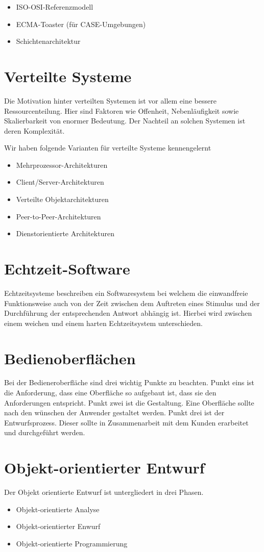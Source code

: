 \begin{itemize}
\item ISO-OSI-Referenzmodell
\item ECMA-Toaster (für CASE-Umgebungen)
\item Schichtenarchitektur 
\end{itemize}

\section{Verteilte Systeme}
Die Motivation hinter verteilten Systemen ist vor allem eine bessere Ressourcenteilung. Hier sind Faktoren wie Offenheit, Nebenläufigkeit sowie Skalierbarkeit von enormer Bedeutung. Der Nachteil an solchen Systemen ist deren Komplexität.

Wir haben folgende Varianten für verteilte Systeme kennengelernt
\begin{itemize}
\item Mehrprozessor-Architekturen
\item Client/Server-Architekturen
\item Verteilte Objektarchitekturen
\item Peer-to-Peer-Architekturen
\item Dienstorientierte Architekturen
\end{itemize}

\section{Echtzeit-Software}
Echtzeitsysteme beschreiben ein Softwaresystem bei welchem die einwandfreie Funktionsweise auch von der Zeit zwischen dem Auftreten eines Stimulus und der Durchführung der entsprechenden Antwort abhängig ist. Hierbei wird zwischen einem weichen und einem harten Echtzeitsystem unterschieden.

\section{Bedienoberflächen}
Bei der Bedieneroberfläche sind drei wichtig Punkte zu beachten. Punkt eins ist die Anforderung, dass eine Oberfläche so aufgebaut ist, dass sie den Anforderungen entspricht. Punkt zwei ist die Gestaltung. Eine Oberfläche sollte nach den wünschen der Anwender gestaltet werden. Punkt drei ist der Entwurfsprozess. Dieser sollte in Zusammenarbeit mit dem Kunden erarbeitet und durchgeführt werden.

\section{Objekt-orientierter Entwurf}
Der Objekt orientierte Entwurf ist untergliedert in drei Phasen.
\begin{itemize}
\item Objekt-orientierte Analyse
\item Objekt-orientierter Enwurf
\item Objekt-orientierte Programmierung
\end{itemize}

